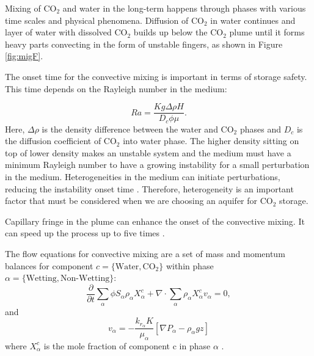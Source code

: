 Mixing of $\mbox{CO}_2$ and water in the long-term happens through phases with various time scales and physical phenomena. Diffusion of
$\mbox{CO}_2$ in water continues and layer of water with dissolved
$\mbox{CO}_2$ builds up below the $\mbox{CO}_2$ plume until it forms heavy parts convecting in
the form of unstable fingers, as shown in Figure \ref{fig:migF}.

The onset time for the convective mixing is important in terms of storage
safety. This time depends on the Rayleigh number in the medium:

\begin{equation}
 Ra = \frac{Kg\Delta \rho H}{D_c \phi \mu}.
 \label{Ra}
\end{equation} Here, $\Delta \rho$ is the density difference between the water and
$\mbox{CO}_2$ phases and $D_c$ is the diffusion coefficient of $\mbox{CO}_2$
into water phase. The higher density sitting on top of lower density makes an
unstable system and the medium must have a minimum Rayleigh number to
have a growing instability for a small perturbation in the medium.
Heterogeneities in the medium can initiate perturbations, reducing the
instability onset time \cite{hassanzadeh2005modelling,elenius2012time}.
Therefore, heterogeneity is an important factor that must be considered when we
are choosing an aquifer for $\mbox{CO}_2$ storage.

Capillary fringe in the plume can enhance the onset of the convective mixing. It can
speed up the process up to five times \cite{eleniuseffects}.

The flow equations for convective mixing are a set of mass and momentum balances for component $c=\{\mbox{Water},\mbox{CO}_2\}$ within phase
$\alpha=\{\mbox{Wetting},\mbox{Non-Wetting}\}$:
\begin{equation}
\frac{\partial}{\partial t} \underset{\alpha}{\sum}\phi S_\alpha \rho_\alpha
X_{\alpha}^c + \nabla \cdot \underset{\alpha}{\sum} \rho_\alpha X_{\alpha}^c
v_\alpha = 0,   
 \label{eq:massCo2}
\end{equation} and 
\begin{equation}
 v_\alpha = -\frac{k_{r_\alpha}K}{\mu_\alpha} \left[  \nabla
P_\alpha-\rho_\alpha g z \right]
 \label{eq:darcyCo2}
\end{equation} where $X_{\alpha}^c$ is the mole fraction of
component $\mbox{c}$ in phase $\alpha$ \cite{elenius2010co2}. 

